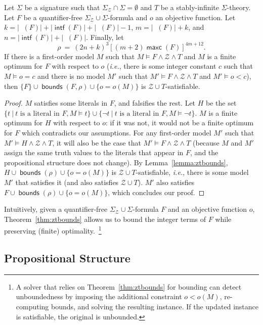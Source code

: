 \documentclass{llncs}
\newcommand{\ie}[0]{\emph{i.e.}, }
\newcommand{\Z}[0]{\ensuremath{\mathcal{Z}}}
\newcommand{\ZT}[0]{\ensuremath{\mathcal{Z} \cup T}}
\newcommand{\SigmaZ}[0]{\ensuremath{\Sigma_{\mathcal{Z}}}}
\newcommand{\SigmaZT}[0]{\ensuremath{\SigmaZ{} \cup \Sigma}}
\DeclareMathOperator{\intf}{\mathsf{intf}}
\DeclareMathOperator{\intfz}{\mathsf{intf}_{\Z}}
\DeclareMathOperator{\maxc}{\mathsf{maxc}}
\DeclareMathOperator{\zatoms}{\mathsf{atoms_{\Z}}}
\DeclareMathOperator{\bounds}{\mathsf{bounds}}
\DeclareMathOperator{\zvars}{\mathsf{vars_{\Z}}}
\begin{document}
\begin{theorem}
  \label{thm:ztbounds}
  Let $\Sigma$ be a signature such that $\SigmaZ{} \cap \Sigma =
  \emptyset$ and $T$ be a stably-infinite $\Sigma$-theory. Let $F$ be
  a quantifier-free $\SigmaZT{}$-formula and $o$ an objective
  function. Let $k = |\zatoms(F)| + |\intf(F)| + |\zvars(F)| - 1$, $m
  = |\intfz(F)| + k$, and $n = |\intf(F)| + |\zvars(F)|$. Finally, let
  $$
  \rho~=~(2 n + k)^3 [(m + 2) \maxc(F)]^{4m + 12}\text{.}
  $$
  If there is a first-order model $M$ such that $M \models F \wedge
  \Z{} \wedge T$ and $M$ is a finite optimum for $F$ with respect to
  $o$ (\ie there is some integer constant $c$ such that $M \models o =
  c$ and there is no model $M'$ such that $M' \models F \wedge \Z{}
  \wedge T$ and $M' \models o < c$), then $\{F\} \cup \bounds(F, \rho)
  \cup \{o = o(M)\}$ is \ZT{}-satisfiable.
\end{theorem}
\begin{proof}
  $M$ satisfies some literals in $F$, and falsifies the rest. Let $H$
  be the set $\{t\ |\ t \text{ is a literal in } F, M \models t\} \cup
  \{\neg t\ |\ t \text{ is a literal in } F, M \models \neg t\}$. $M$
  is a finite optimum for $H$ with respect to $o$: if it was not, it
  would not be a finite optimum for $F$ which contradicts our
  assumptions. For any first-order model $M'$ such that $M' \models H
  \wedge \Z{} \wedge T$, it will also be the case that $M' \models F
  \wedge \Z{} \wedge T$ (because $M$ and $M'$ assign the same truth
  values to the literals that appear in $F$, and the propositional
  structure does not change). By Lemma~\ref{lemma:ztbounds}, $H \cup
  \bounds(\rho) \cup \{o = o(M)\}$ is \ZT{}-satisfiable, \ie there is
  some model $M'$ that satisfies it (and also satisfies \ZT{}). $M'$
  also satisfies $F \cup \bounds(\rho) \cup \{o = o(M)\}$, which
  concludes our proof.
\end{proof}

Intuitively, given a quantifier-free \SigmaZT{}-formula $F$ and an
objective function $o$, Theorem~\ref{thm:ztbounds} allows us to bound
the integer terms of $F$ while preserving (finite)
optimality.~\footnote{A solver that relies on
  Theorem~\ref{thm:ztbounds} for bounding can detect unboundedness by
  imposing the additional constraint $o < o(M)$, re-computing bounds,
  and solving the resulting instance. If the updated instance is
  satisfiable, the original is unbounded.}

\subsection{Propositional Structure}
\label{sec:smt:prop}
\end{document}
